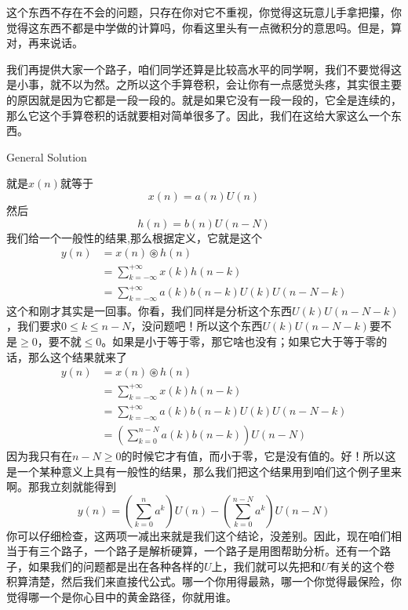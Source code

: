 \documentclass[a4paper,12pt]{article}
\begin{document}
这个东西不存在不会的问题，只存在你对它不重视，你觉得这玩意儿手拿把攥，你觉得这东西不都是中学做的计算吗，你看这里头有一点微积分的意思吗。但是，算对，再来说话。

我们再提供大家一个路子，咱们同学还算是比较高水平的同学啊，我们不要觉得这是小事，就不以为然。之所以这个手算卷积，会让你有一点感觉头疼，其实很主要的原因就是因为它都是一段一段的。就是如果它没有一段一段的，它全是连续的，那么它这个手算卷积的话就要相对简单很多了。因此，我们在这给大家这么一个东西。

General Solution

就是$x(n)$就等于
\begin{equation}
    x(n) = a(n)U(n)
\end{equation}
然后
\begin{equation}
    h(n) = b(n)U(n-N)
\end{equation}
我们给一个一般性的结果,那么根据定义，它就是这个
\begin{equation}
\begin{aligned}
   y(n) &= x(n)\circledast h(n)\\
&= \sum_{k=-\infty}^{+\infty}x(k)h(n-k)\\
&= \sum_{k=-\infty}^{+\infty}a(k)b(n-k)U(k)U(n-N-k)
\end{aligned}
\end{equation}
这个和刚才其实是一回事。你看，我们同样是分析这个东西$U(k)U(n-N-k)$，我们要求$0 \le k \le n-N$，没问题吧！所以这个东西$U(k)U(n-N-k)$要不是$\ge 0$，要不就$\le 0$。如果是小于等于零，那它啥也没有；如果它大于等于零的话，那么这个结果就来了
\begin{equation}
\begin{aligned}
   y(n) &= x(n)\circledast h(n)\\
&= \sum_{k=-\infty}^{+\infty}x(k)h(n-k)\\
&= \sum_{k=-\infty}^{+\infty}a(k)b(n-k)U(k)U(n-N-k)\\
&=\left ( \sum_{k=0}^{n-N}a(k)b(n-k) \right )U(n-N) 
\end{aligned}
\end{equation}
因为我只有在$n-N \ge 0$的时候它才有值，而小于零，它是没有值的。好！所以这是一个某种意义上具有一般性的结果，那么我们把这个结果用到咱们这个例子里来啊。那我立刻就能得到
\begin{equation}
   y(n) = \left ( \sum_{k=0}^n a^k \right )U(n) - \left ( \sum_{k=0}^{n-N} a^k \right )U(n-N)
\end{equation}
你可以仔细检查，这两项一减出来就是我们这个结论，没差别。因此，现在咱们相当于有三个路子，一个路子是解析硬算，一个路子是用图帮助分析。还有一个路子，如果我们的问题都是出在各种各样的$U$上，我们就可以先把和$U$有关的这个卷积算清楚，然后我们来直接代公式。哪一个你用得最熟，哪一个你觉得最保险，你觉得哪一个是你心目中的黄金路径，你就用谁。
\end{document}
